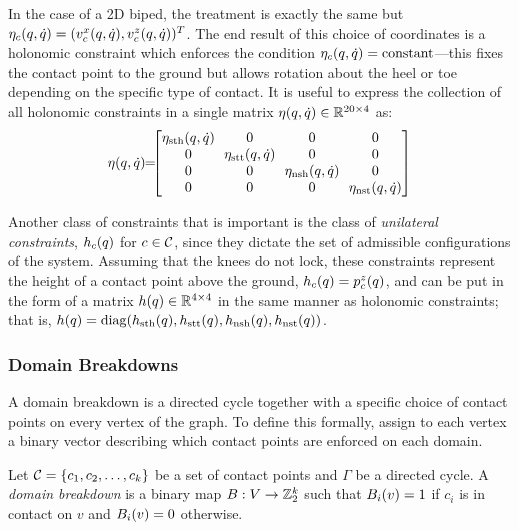 In the case of a 2D biped, the treatment is exactly the same but $\eta_{c}(q, \dot{q}) = (v_{c}^{x}(q, \dot{q}), v_{c}^{z}(q, \dot{q}))^T$.
%
The end result of this choice of coordinates is a holonomic constraint which enforces the condition $\eta_{c}(q, \dot{q}) = \mathrm{constant}$---this fixes the contact point to the ground but allows rotation about the heel or toe depending on the specific type of contact.
%
It is useful to express the collection of all holonomic constraints in a single matrix $\eta(q, \dot{q}) \in \mathbb{R}^{20 \times 4}$ as:
\begin{align}
  \eta\argsqdq \!\! = \!\!\! \left[\!\!\begin{array}{c c c c}
    \! \eta_{\sth}\argsqdq \! & 0 & 0 & 0 \\
    0 & \! \eta_{\stt}\argsqdq \! & 0 & 0 \\
    0 & 0 & \! \eta_{\nsh}\argsqdq \! & 0 \\
    0 & 0 & 0 & \! \eta_{\nst}\argsqdq \!
    \end{array}\!\!\right]
\end{align}

Another class of constraints that is important is the class of {\it unilateral constraints}, $h_{c}(q)$ for $c \in \mathcal{C}$, since they dictate the set of admissible configurations of the system.
%
Assuming that the knees do not lock, these constraints represent the height of a contact point above the ground, $h_{c}(q) = p_{c}^{z}(q)$, and can be put in the form of a matrix $h(q) \in \mathbb{R}^{4 \times 4}$ in the same manner as holonomic constraints;
%
that is, $h(q) = \mathrm{diag}(h_{\mathrm{sth}}(q), h_{\mathrm{stt}}(q), h_{\mathrm{nsh}}(q), h_{\mathrm{nst}}(q))$.

\subsubsection{Domain Breakdowns}

A domain breakdown is a directed cycle together with a specific choice of contact points on every vertex of the graph.
%
To define this formally, assign to each vertex a binary vector describing which contact points are enforced on each domain.

\gap

\begin{definition}
  \label{def:domainbreakdown}
  Let $\mathcal{C} = \{c_{1}, c_{2}, \ldots, c_{k}\}$ be a set of contact points and $\Gamma$ be a directed cycle.
  A {\it domain breakdown} is a binary map $B : V \to \mathbb{Z}_{2}^{k}$ such that $B_{i}(v) = 1$ if $c_{i}$ is in contact on $v$ and $B_{i}(v) = 0$ otherwise.
\end{definition}

